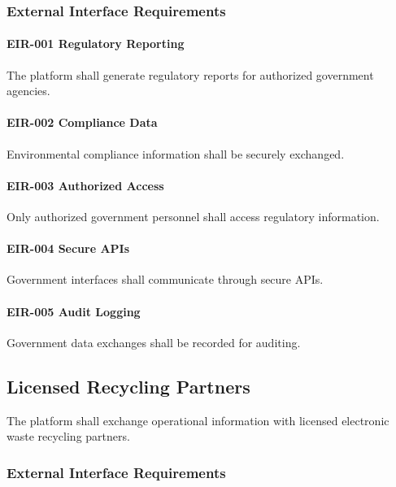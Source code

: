 \subsubsection*{External Interface Requirements}

\paragraph{EIR-001 Regulatory Reporting}

The platform shall generate regulatory reports for authorized
government agencies.

\paragraph{EIR-002 Compliance Data}

Environmental compliance information shall be securely exchanged.

\paragraph{EIR-003 Authorized Access}

Only authorized government personnel shall access regulatory
information.

\paragraph{EIR-004 Secure APIs}

Government interfaces shall communicate through secure APIs.

\paragraph{EIR-005 Audit Logging}

Government data exchanges shall be recorded for auditing.


\subsection{Licensed Recycling Partners}

The platform shall exchange operational information with licensed
electronic waste recycling partners.


\subsubsection*{External Interface Requirements}

